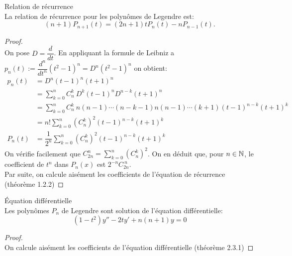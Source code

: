 \bprop
Relation de récurrence
\\La relation de récurrence pour les polynômes de Legendre est:
$$(n+1)P_{n+1}(t)=(2n+1)tP_{n}(t)-nP_{n-1}(t).$$
\eprop

\begin{proof}
$ $\\
On pose $D=\dfrac{d}{dt}$. En appliquant la formule de Leibniz a $p_{n}(t):=\dfrac{d^{n}}{dt^{n}}(t^{2}-1)^{n}=D^{n}(t^{2}-1)^{n}$ on obtient:
\begin{align*}
p_{n}(t) & = D^{n}(t-1)^{n}(t+1)^{n}\\
& = \sum\limits_{k=0}^{n} C^k_n \ D^{k}(t-1)^{n}D^{n-k}(t+1)^{n}\\
& = \sum\limits_{k=0}^{n} C^k_n \ n(n-1)\cdots (n-k-1)n(n-1) \cdots (k+1)(t-1)^{n-k}(t+1)^k\\
& = n!\sum\limits_{k=0}^{n}(C^k_n)^{2}(t-1)^{n-k}(t+1)^{k}\\
P_{n}(t) & = \dfrac{1}{2^{n}}\sum\limits_{k=0}^{n}(C^k_n)^{2}(t-1)^{n-k}(t+1)^{k}
\end{align*}
On vérifie facilement que $\displaystyle{ C^n_{2n}=\sum\limits_{k=0}^{n}(C^k_n)^{2}}$. On en déduit que, pour $ n\in \mathbb N $, le coefficient de $ t^{n} $ dans $ P_{n}(x) $ est $ \displaystyle{2^{-n} C^{\ n}_{2n}}$.
\\Par suite, on calcule aisément les coefficients de l'équation de récurrence (théorème 1.2.2)
\end{proof}

\bprop
Équation différentielle
\\Les polynômes $ P_{n} $ de Legendre sont solution de l'équation différentielle:
$$(1-t^{2})y''-2ty'+n(n+1)y=0$$
\eprop
\begin{proof}
$ $\\On calcule aisément les coefficients de l'équation différentielle (théorème 2.3.1)
\end{proof}

